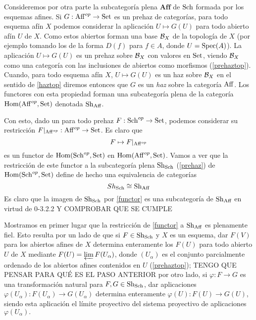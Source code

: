 \documentclass[twoside]{article}
\begin{document}
Consideremos por otra parte la subcategoría plena $\mathrm{\mathbf{Aff}}$ de $\operatorname{Sch}$ formada por los esquemas afines. Si $G:\operatorname{Aff}^{op}\to\operatorname{Set}$ es un prehaz de categorías, para todo esquema afín $X$ podemos considerar la aplicación $U\mapsto G(U)$ para todo abierto afín $U$ de $X$. Como estos abiertos forman una base ${\mathcal B}_X$ de la topología de $X$ (por ejemplo tomando los de la forma $D(f)$ para $f\in A$, donde $U=\operatorname{Spec}(A)$). La aplicación $U\mapsto G(U)$ es un prehaz sobre ${\mathcal B}_X$ con valores en $\operatorname{Set}$, viendo ${\mathcal B}_X$ como una categoría con las inclusiones de abiertos como morfismos (\ref{prehaztop}). Cuando, para todo esquema afín $X$, $U\mapsto G(U)$ es un haz sobre ${\mathcal B}_X$ en el sentido de \ref{haztop} diremos entonces que $G$ es un \emph{haz} sobre la categoría $\operatorname{Aff}$. Los functores con esta propiedad forman una subcategoría plena de la categoría $\operatorname{Hom}(\operatorname{Aff}^{op},\operatorname{Set})$ denotada $\operatorname{Sh}_{\operatorname{Aff}}$. 

Con esto, dado un para todo prehaz $F:\operatorname{Sch}^{op}\to \operatorname{Set}$, podemos considerar su restricción $F|_{\operatorname{Aff}^{op}}:\operatorname{Aff}^{op}\to\operatorname{Set}$. Es claro que
\begin{equation}\label{functor}
F\mapsto F|_{\operatorname{Aff}^{op}}
\end{equation}
es un functor de $\operatorname{Hom}(\operatorname{Sch}^{op},\operatorname{Set})$ en $\operatorname{Hom}(\operatorname{Aff}^{op},\operatorname{Set})$. Vamos a ver que la restricción de este functor a la subcategoría plena $\operatorname{Sh}_{\operatorname{Sch}}$ (\ref{prehaz}) de $\operatorname{Hom}(\operatorname{Sch}^{op},\operatorname{Set})$ define de hecho una equivalencia de categorías 
\begin{equation}\label{equivalencia}
Sh_{\operatorname{Sch}}\cong\operatorname{Sh}_{\operatorname{Aff}}
\end{equation}
Es claro que la imagen de $\operatorname{Sh}_{\operatorname{Sch}}$ por \ref{functor} es una subcategoría de $\operatorname{Sh}_{\operatorname{Aff}}$ en virtud de 0-3.2.2 Y COMPROBAR QUE SE CUMPLE

Mostramos en primer lugar que la restricción de \ref{functor} a $\operatorname{Sh}_{\operatorname{Aff}}$ es plenamente fiel. Esto resulta por un lado de que si $F\in \operatorname{Sh}_{\operatorname{Sch}}$ y $X$ es un esquema, dar $F(V)$ para los abiertos afines de $X$ determina enteramente los $F(U)$ para todo abierto $U$ de $X$ mediante $F(U)=\varprojlim F(U_\alpha)$, donde $(U_\alpha)$ es el conjunto parcialmente ordenado de los abiertos afines contenidos en $U$ (\ref{prehaztop}); TENGO QUE PENSAR PARA QUÉ ES EL PASO ANTERIOR
 por otro lado, si $\varphi:F\to G$ es una transformación natural para $F,G\in \operatorname{Sh}_{\operatorname{Sch}}$, dar aplicaciones $\varphi(U_\alpha):F(U_\alpha)\to G(U_\alpha)$ determina enteramente $\varphi(U):F(U)\to G(U)$, siendo esta aplicación el límite proyectivo del sistema proyectivo de aplicaciones $\varphi(U_\alpha).$%
 
\end{document}
